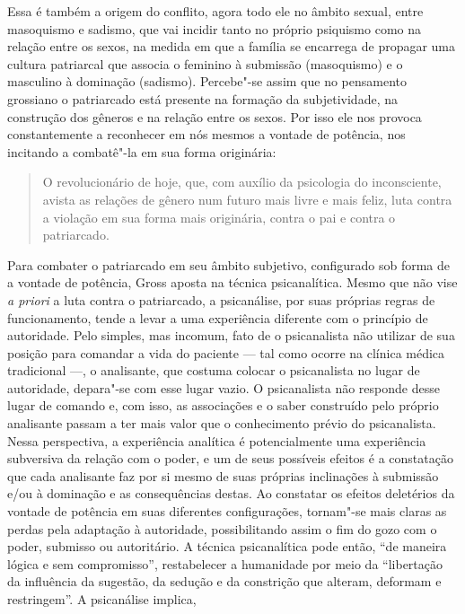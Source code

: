 Essa é também a origem do conflito, agora todo ele no âmbito sexual,
entre masoquismo e sadismo, que vai incidir tanto no próprio psiquismo
como na relação entre os sexos, na medida em que a família se encarrega
de propagar uma cultura patriarcal que associa o feminino à submissão
(masoquismo) e o masculino à dominação (sadismo). Percebe"-se assim que
no pensamento grossiano o patriarcado está presente na formação da
subjetividade, na construção dos gêneros e na relação entre os sexos.
Por isso ele nos provoca constantemente a reconhecer em nós mesmos a
vontade de potência, nos incitando a combatê"-la em sua forma originária:

\begin{quote}
O revolucionário de hoje, que, com auxílio da psicologia do
inconsciente, avista as relações de gênero num futuro mais livre e mais
feliz, luta contra a violação em sua forma mais originária, contra o pai
e contra o patriarcado.
\end{quote}

Para combater o patriarcado em seu âmbito subjetivo, configurado sob
forma de a vontade de potência, Gross aposta na técnica psicanalítica.
Mesmo que não vise \emph{a priori} a luta contra o patriarcado, a
psicanálise, por suas próprias regras de funcionamento, tende a levar a
uma experiência diferente com o princípio de autoridade. Pelo simples,
mas incomum, fato de o psicanalista não utilizar de sua posição para
comandar a vida do paciente --- tal como ocorre na clínica médica
tradicional ---, o analisante, que costuma colocar o psicanalista no
lugar de autoridade, depara"-se com esse lugar vazio. O psicanalista não
responde desse lugar de comando e, com isso, as associações e o saber
construído pelo próprio analisante passam a ter mais valor que o
conhecimento prévio do psicanalista. Nessa perspectiva, a experiência
analítica é potencialmente uma experiência subversiva da relação com o
poder, e um de seus possíveis efeitos é a constatação que cada
analisante faz por si mesmo de suas próprias inclinações à submissão
e/ou à dominação e as consequências destas. Ao constatar os efeitos
deletérios da vontade de potência em suas diferentes configurações,
tornam"-se mais claras as perdas pela adaptação à autoridade,
possibilitando assim o fim do gozo com o poder, submisso ou autoritário.
A técnica psicanalítica pode então, ``de maneira lógica e sem
compromisso'', restabelecer a humanidade por meio da ``libertação da
influência da sugestão, da sedução e da constrição que alteram, deformam
e restringem''. A psicanálise implica,

